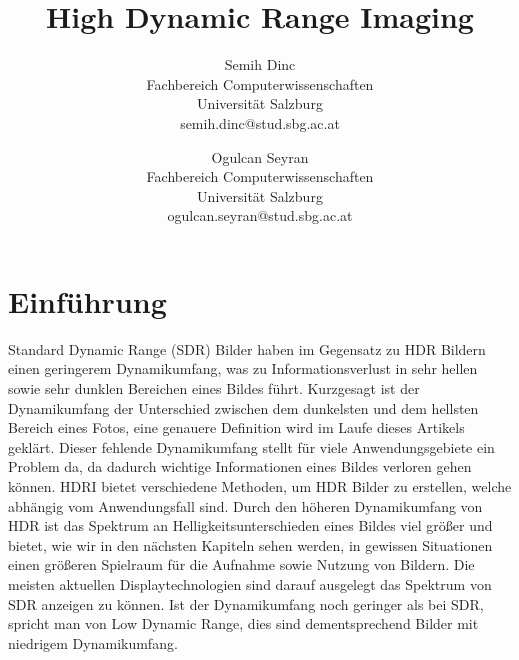 \documentclass[11pt, a4paper, twocolumn]{article}
\title{\textbf{High Dynamic Range Imaging}}
\date{}
\author{Semih Dinc \\
		Fachbereich Computerwissenschaften \\
		Universität Salzburg \\
		semih.dinc@stud.sbg.ac.at \\
	 \and Ogulcan Seyran \\
	 	Fachbereich Computerwissenschaften \\
	 	Universität Salzburg \\
 		ogulcan.seyran@stud.sbg.ac.at}
\begin{document}
	
	\section{Einführung}
	Standard Dynamic Range (SDR) Bilder haben im Gegensatz zu HDR Bildern einen geringerem Dynamikumfang, was zu Informationsverlust in sehr hellen sowie sehr dunklen Bereichen eines Bildes führt. Kurzgesagt ist der Dynamikumfang der Unterschied zwischen dem dunkelsten und dem hellsten Bereich eines Fotos, eine genauere Definition wird im Laufe dieses Artikels geklärt. Dieser fehlende Dynamikumfang stellt für viele Anwendungsgebiete ein Problem da, da dadurch wichtige Informationen eines Bildes verloren gehen können. HDRI bietet verschiedene Methoden, um HDR Bilder zu erstellen, welche abhängig vom Anwendungsfall sind. Durch den höheren Dynamikumfang von HDR ist das Spektrum an Helligkeitsunterschieden eines Bildes viel größer und bietet, wie wir in den nächsten Kapiteln sehen werden, in gewissen Situationen einen größeren Spielraum für die Aufnahme sowie Nutzung von Bildern. Die meisten aktuellen Displaytechnologien sind darauf ausgelegt das Spektrum von SDR anzeigen zu können. Ist der Dynamikumfang noch geringer als bei SDR, spricht man von Low Dynamic Range, dies sind dementsprechend Bilder mit niedrigem Dynamikumfang.
\end{document}
